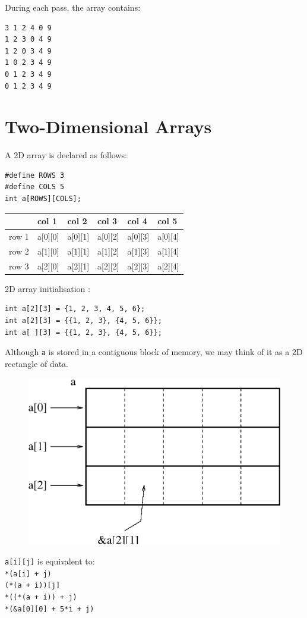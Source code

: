 \documentclass[a4,portraitt]{slides}
\begin{document}
During each pass, the array contains:
\begin{verbatim}
3 1 2 4 0 9
1 2 3 0 4 9
1 2 0 3 4 9
1 0 2 3 4 9
0 1 2 3 4 9
0 1 2 3 4 9
\end{verbatim}

\newpage
\section*{Two-Dimensional Arrays}
A 2D array is declared as follows:
\begin{verbatim}
#define ROWS 3
#define COLS 5
int a[ROWS][COLS];
\end{verbatim}
\begin{center}
\begin{tabular}{|l|l|l|l|l|l|} \hline
    &   col 1   & col 2 & col 3 & col 4 & col 5 \\ \hline
row 1   & a[0][0]   & a[0][1]   & a[0][2]   & a[0][3]   & a[0][4] \\
row 2   & a[1][0]   & a[1][1]   & a[1][2]   & a[1][3]   & a[1][4] \\
row 3   & a[2][0]   & a[2][1]   & a[2][2]   & a[2][3]   & a[2][4] \\ \hline
\end{tabular}
\end{center}
 2D array initialisation :
\begin{verbatim}
int a[2][3] = {1, 2, 3, 4, 5, 6};
int a[2][3] = {{1, 2, 3}, {4, 5, 6}};
int a[ ][3] = {{1, 2, 3}, {4, 5, 6}};
\end{verbatim}

\newpage
Although \verb^a^ is stored in a contiguous block of memory,
we may think of it as a 2D rectangle of data.
\begin{center}
\begin{figure}[h]
\centerline{
\includegraphics{../Figs/array9_3.eps}
}
\end{figure}
\end{center}
\verb^a[i][j]^ is equivalent to:\\
\verb^*(a[i] + j)^\\
\verb^(*(a + i))[j]^\\
\verb^*((*(a + i)) + j)^\\
\verb^*(&a[0][0] + 5*i + j)^
\end{document}
